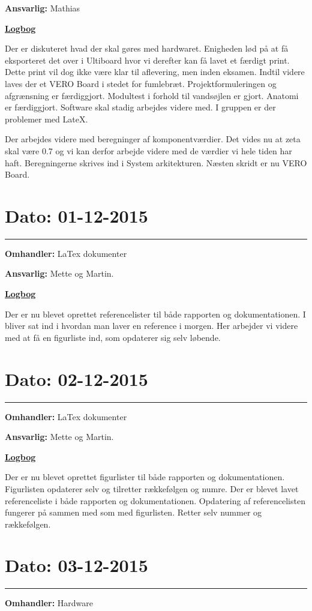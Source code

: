 \textbf{Ansvarlig:} Mathias

\underline{\textbf{Logbog}}

Der er diskuteret hvad der skal gøres med hardwaret. Enigheden lød på at få eksporteret det over i Ultiboard hvor vi derefter kan få lavet et færdigt print. Dette print vil dog ikke være klar til aflevering, men inden eksamen. Indtil videre laves der et VERO Board i stedet for fumlebræt.
Projektformuleringen og afgrænsning er færdiggjort. Modultest i forhold til vandsøjlen er gjort. Anatomi er færdiggjort. Software skal stadig arbejdes videre med. I gruppen er der problemer med LateX.

Der arbejdes videre med beregninger af komponentværdier. Det vides nu at zeta skal være 0.7 og vi kan derfor arbejde videre med de værdier vi hele tiden har haft. Beregningerne skrives ind i System arkitekturen. Næsten skridt er nu VERO Board.  
\\

\section{Dato: 01-12-2015}
\hrule
\textbf{Omhandler:} LaTex dokumenter

\textbf{Ansvarlig:} Mette og Martin. 

\underline{\textbf{Logbog}}

Der er nu blevet oprettet referencelister til både rapporten og dokumentationen. I bliver sat ind i hvordan man laver en reference i morgen. Her arbejder vi videre med at få en figurliste ind, som opdaterer sig selv løbende.  
\\

\section{Dato: 02-12-2015}
\hrule
\textbf{Omhandler:} LaTex dokumenter

\textbf{Ansvarlig:} Mette og Martin. 

\underline{\textbf{Logbog}}

Der er nu blevet oprettet figurlister til både rapporten og dokumentationen. Figurlisten opdaterer selv og tilretter rækkefølgen og numre. Der er blevet lavet referenceliste i både rapporten og dokumentationen. Opdatering af referencelisten fungerer på sammen med som med figurlisten. Retter selv nummer og rækkefølgen.  
\\

\section{Dato: 03-12-2015}
\hrule
\textbf{Omhandler:} Hardware

